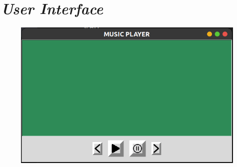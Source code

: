 \documentclass{article}
\begin{document}
\section{\emph{User Interface}}

\begin{figure}[ht]
\includegraphics[width=\columnwidth]{images/figure.png}


\end{figure}
\end{document}

